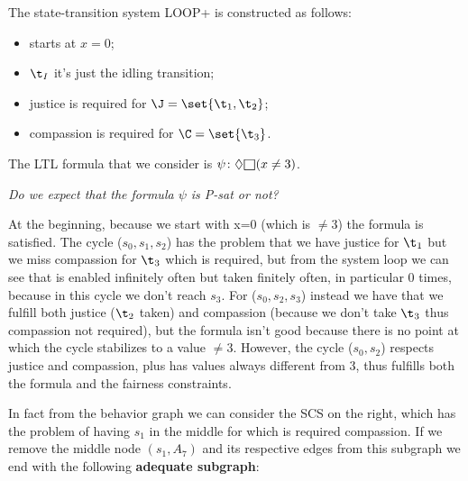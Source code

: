 \documentclass[oneside]{academica}
\begin{document}
\begin{example*}
  The state-transition system LOOP+ is constructed as follows:
  \begin{itemize}
    \item starts at $x=0$;
    \item $\t_I$ it's just the idling transition;
    \item justice is required for $\J = \set{\t_1,\t_2}$;
    \item compassion is required for $\C = \set{\t_3}$.
  \end{itemize}

  \begin{center}
    
  \end{center}
  The LTL formula that we consider is $\psi \colon \Diamond\msquare(x \neq 3)$.

  \begin{center}
    
  \end{center}

  \begin{center}
    
  \end{center}

  \bigskip
  \textit{Do we expect that the formula $\psi$ is P-sat or not?}

  At the beginning, because we start with x=0 (which is $\neq 3$) the formula is satisfied.
  The cycle ($s_0,s_1,s_2$) has the problem that we have justice for $\t_1$ but we miss compassion for $\t_3$ which is required, but from the system loop we can see that is enabled infinitely often but taken finitely often, in particular 0 times, because in this cycle we don't reach $s_3$.
  For ($s_0,s_2,s_3$) instead we have that we fulfill both justice ($\t_2$ taken) and compassion (because we don't take $\t_3$ thus compassion not required), but the formula isn't good because there is no point at which the cycle stabilizes to a value $\neq 3$.
  However, the cycle ($s_0,s_2$) respects justice and compassion, plus has values always different from 3, thus fulfills both the formula and the fairness constraints.

  In fact from the behavior graph we can consider the SCS on the right, which has the problem of having $s_1$ in the middle for which is required compassion.
  If we remove the middle node $(s_1, A_7)$ and its respective edges from this subgraph we end with the following \textbf{adequate subgraph}:
  \begin{center}
    
  \end{center}
\end{example*}
\end{document}

